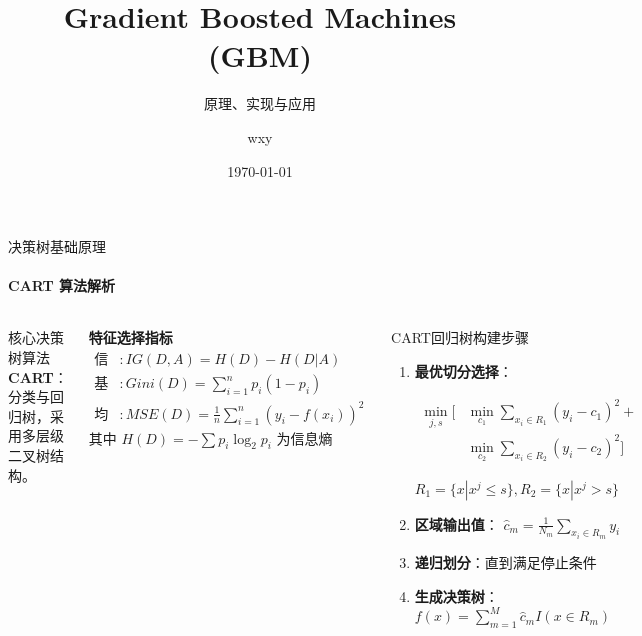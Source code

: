 \documentclass{ctexbeamer}
\title{Gradient Boosted Machines (GBM)}
\subtitle{原理、实现与应用}
\author{wxy}
\date{\today}
\begin{document}
\begin{frame}
\titlepage
\end{frame}

\begin{frame}{决策树基础原理}
\framesubtitle{CART 算法解析}

\begin{columns}[T]
\begin{block}{核心决策树算法}
\textbf{CART}：分类与回归树，采用多层级二叉树结构。
\end{block}

\textbf{特征选择指标}
\small
\begin{align*}
\text{信息增益} &: IG(D,A) = H(D) - H(D|A) \\
\text{基尼系数} &: Gini(D) = \sum_{i=1}^{n}p_i(1-p_i) \\
\text{均方误差} &: MSE(D) = \frac{1}{n}\sum_{i=1}^{n}(y_i - f(x_i))^2
\end{align*}
\footnotesize{其中 $H(D) = -\sum p_i\log_2 p_i$ 为信息熵}

\begin{block}{CART回归树构建步骤}
\begin{enumerate}
\small
\item \textbf{最优切分选择}：

\[
\begin{aligned}    
\min_{j,s} [ 
&\min_{c_1} \sum_{x_i \in R_1} (y_i - c_1)^2 + \\
&\min_{c_2} \sum_{x_i \in R_2} (y_i - c_2)^2 
]
\end{aligned}
\]

$R_1 = \{x | x^j \leq s\}, R_2 = \{x | x^j > s\}$

\item \textbf{区域输出值}：
$\hat{c}_m = \frac{1}{N_m} \sum_{x_i \in R_m} y_i$

\item \textbf{递归划分}：直到满足停止条件

\item \textbf{生成决策树}：
$f(x) = \sum_{m=1}^{M} \hat{c}_m I(x \in R_m)$
\end{enumerate}
\end{block}
\end{columns}

\end{frame}
\end{document}

